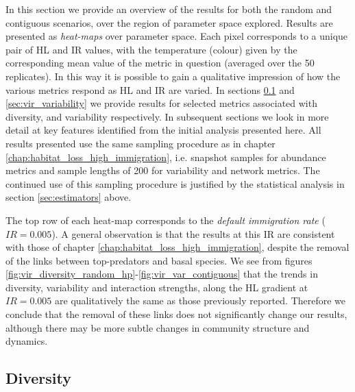 In this section we provide an overview of the results for both the random and contiguous scenarios, over the region of parameter space explored. Results are presented as \emph{heat-maps} over parameter space. Each pixel corresponds to a unique pair of HL and IR values, with the temperature (colour) given by the corresponding mean value of the metric in question (averaged over the 50 replicates). In this way it is possible to gain a qualitative impression of how the various metrics respond as HL and IR are varied. In sections \ref{sec:vir_diversity} and \ref{sec:vir_variability} we provide results for selected metrics associated with diversity, and variability respectively. In subsequent sections we look in more detail at key features identified from the initial analysis presented here. All results presented use the same sampling procedure as in chapter \ref{chap:habitat_loss_high_immigration}, i.e. snapshot samples for abundance metrics and sample lengths of 200 for variability and network metrics.  The continued use of this sampling procedure is justified by the statistical analysis in section \ref{sec:estimators} above. 

The top row of each heat-map corresponds to the \emph{default immigration rate} ($IR=0.005$). A general observation is that the results at this IR are consistent with those of chapter \ref{chap:habitat_loss_high_immigration}, despite the removal of the links between top-predators and basal species. We see from figures \ref{fig:vir_diversity_random_hp}-\ref{fig:vir_var_contiguous} that the trends in diversity, variability and interaction strengths, along the HL gradient at $IR=0.005$ are qualitatively the same as those previously reported. Therefore we conclude that the removal of these links does not significantly change our results, although there may be more subtle changes in community structure and dynamics.   


\subsection{Diversity}
\label{sec:vir_diversity}

